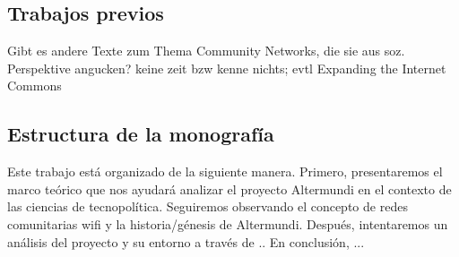 \begin{comment}
\noindent \emph{Welche Ziele werden mit der Arbeit verfolgt? Welche zentralen Fragen lassen sich daraus ableiten?}
	Die Ziele sollten so spezifisch wie möglich sein. Das hilft Ihnen im Verlauf der Umsetzung zu prüfen, ob Sie Ihre Ziele erreichen konnten. Bitte achten Sie darauf, dass die gesetzten Ziele realistisch sind und das Sie in der Lage sind, das erfolgreiche Erreichen dieser Ziele im Bereich Evaluation zu prüfen.
  \end{comment}


\begin{comment}
* análisis: ciberoptimismo al nivel físico de las redes/al nivel social de la organización de los grupos
\end{comment}


\begin{comment}
La noción ``Redes'' tiene sentidos multiples:
* redes sociales, en el sentido de grupos de gente y las relaciones entre ellxs
* redes sociales, en el sentido de herramientas y aplicaciones digitales que permiten que la gente se relacione de cierta manera en el ámbito digital
* redes en el sentido de la ANT: un modelo abstracto para observar interacción y redistribución de relaciones/recursos/poder; permiten hacer zoom in and out
* redes como infraestructura física: cables, computadoras, antenas, routers <-- un requisito para las demás capas/la mayoría de los sentidos
** también redes sociales de gente (en un sentido amplio: gente organizada/estructurada de cierta manera) que decide/construye y mantiene la infraestructura física.
--> potencial conflictivo enorme: lxs que/quienes controlan la infraestructura, controlan la comunicación y tienen un poder enorme
\end{comment}

\subsection{Trabajos previos}

Gibt es andere Texte zum Thema Community Networks, die sie aus soz. Perspektive angucken?
keine zeit bzw kenne nichts; evtl Expanding the Internet Commons

\subsection{Estructura de la monografía}

Este trabajo está organizado de la siguiente manera.
Primero, presentaremos el marco teórico que nos ayudará analizar el proyecto Altermundi en el contexto de las ciencias de tecnopolítica.
Seguiremos observando el concepto de redes comunitarias wifi y la historia/génesis de Altermundi.
Después, intentaremos un análisis del proyecto y su entorno a través de ..
En conclusión, ...


